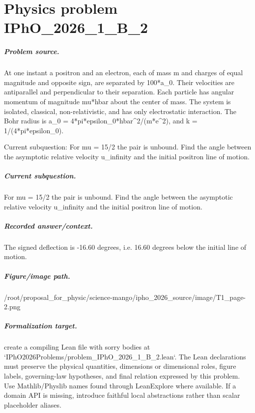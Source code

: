 
\chapter{Physics problem IPhO\_2026\_1\_B\_2}
\label{ch:IPhO2026Problems_problem_IPhO_2026_1_B_2}

\paragraph{Problem source.}
At one instant a positron and an electron, each of mass m and charges of equal
magnitude and opposite sign, are separated by 100*a\_0.  Their velocities are
antiparallel and perpendicular to their separation.  Each particle has angular
momentum of magnitude mu*hbar about the center of mass.  The system is isolated,
classical, non-relativistic, and has only electrostatic interaction.  The Bohr
radius is a\_0 = 4*pi*epsilon\_0*hbar\textasciicircum{}2/(m*e\textasciicircum{}2), and k = 1/(4*pi*epsilon\_0).

Current subquestion:
For mu = 15/2 the pair is unbound. Find the angle between the asymptotic relative velocity u\_infinity and the initial positron line of motion.

\paragraph{Current subquestion.}
For mu = 15/2 the pair is unbound. Find the angle between the asymptotic relative velocity u\_infinity and the initial positron line of motion.

\paragraph{Recorded answer/context.}
The signed deflection is -16.60 degrees, i.e. 16.60 degrees below the initial line of motion.

\paragraph{Figure/image path.}
/root/proposal\_for\_physic/science-mango/ipho\_2026\_source/image/T1\_page-2.png

\paragraph{Formalization target.}
create a compiling Lean file with sorry bodies at `IPhO2026Problems/problem\_IPhO\_2026\_1\_B\_2.lean`.
The Lean declarations must preserve the physical quantities, dimensions or dimensional roles, figure labels, governing-law hypotheses, and final relation expressed by this problem.
Use Mathlib/Physlib names found through LeanExplore where available. If a domain API is missing, introduce faithful local abstractions rather than scalar placeholder aliases.

